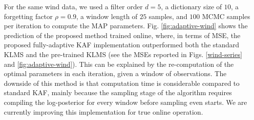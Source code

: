 
For the same wind data, we used a filter order $d=5$, a dictionary size of $10$, a forgetting factor $\rho=0.9$, a window length of $25$ samples, and $100$ MCMC samples per iteration to compute the MAP parameters. Fig. \ref{fig:adaptive-wind} shows the prediction of the proposed method trained online, where, in terms of MSE, the proposed fully-adaptive KAF implementation outperformed both the standard KLMS and the pre-trained KLMS (see the MSEs reported in Figs. \ref{wind-series} and \ref{fig:adaptive-wind}). This can be explained by the re-computation of the optimal parameters in each iteration, given a window of observations. The downside of this method is that computation time is considerable compared to standard KAF, mainly because the sampling stage of the algorithm requires compiling the log-posterior for every window before sampling even starts. We are currently improving this implementation for true online operation.

